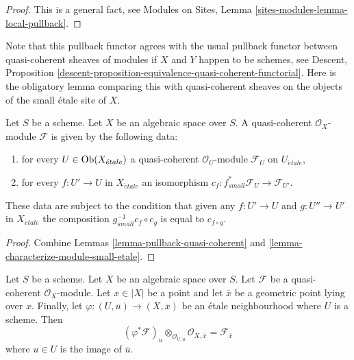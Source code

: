 \begin{proof}
This is a general fact, see
Modules on Sites, Lemma \ref{sites-modules-lemma-local-pullback}.
\end{proof}

\noindent
Note that this pullback functor agrees with the usual pullback functor
between quasi-coherent sheaves of modules if $X$ and $Y$ happen to be
schemes, see
Descent, Proposition
\ref{descent-proposition-equivalence-quasi-coherent-functorial}.
Here is the obligatory lemma comparing this with quasi-coherent sheaves
on the objects of the small \'etale site of $X$.

\begin{lemma}
\label{lemma-characterize-quasi-coherent-small-etale}
Let $S$ be a scheme. Let $X$ be an algebraic space over $S$.
A quasi-coherent $\mathcal{O}_X$-module $\mathcal{F}$
is given by the following data:
\begin{enumerate}
\item for every $U \in \mathop{\rm Ob}\nolimits(X_{\acute{e}tale})$ a quasi-coherent
$\mathcal{O}_U$-module $\mathcal{F}_U$ on $U_{\acute{e}tale}$,
\item for every $f : U' \to U$ in $X_{\acute{e}tale}$ an isomorphism
$c_f : f_{small}^*\mathcal{F}_U \to \mathcal{F}_{U'}$.
\end{enumerate}
These data are subject to the condition that given any $f : U' \to U$
and $g : U'' \to U'$ in $X_{\acute{e}tale}$ the composition
$g_{small}^{-1}c_f \circ c_g$ is equal to $c_{f \circ g}$.
\end{lemma}

\begin{proof}
Combine Lemmas \ref{lemma-pullback-quasi-coherent} and
\ref{lemma-characterize-module-small-etale}.
\end{proof}

\begin{lemma}
\label{lemma-stalk-quasi-coherent}
Let $S$ be a scheme.
Let $X$ be an algebraic space over $S$.
Let $\mathcal{F}$ be a quasi-coherent $\mathcal{O}_X$-module.
Let $x \in |X|$ be a point and let $\overline{x}$ be a geometric
point lying over $x$. Finally, let
$\varphi : (U, \overline{u}) \to (X, \overline{x})$
be an \'etale neighbourhood where $U$ is a scheme.
Then
$$
(\varphi^*\mathcal{F})_u \otimes_{\mathcal{O}_{U, u}}
\mathcal{O}_{X, \overline{x}} =
\mathcal{F}_{\overline{x}}
$$
where $u \in U$ is the image of $\overline{u}$.
\end{lemma}

